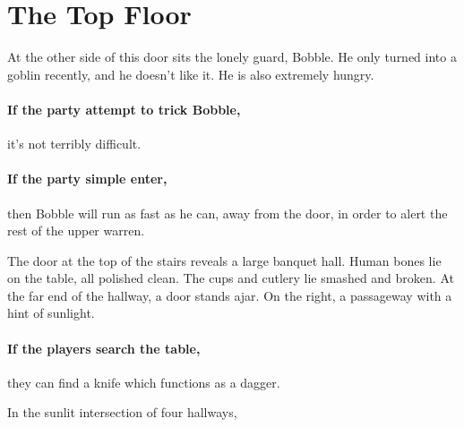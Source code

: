 \section{The Top Floor}
\label{upper}

\setcounter{list}{0}

\begin{multicols}{2}

\begin{figure*}[t]
	
\end{figure*}


At the other side of this door sits the lonely guard, Bobble.
He only turned into a goblin recently, and he doesn't like it.
He is also extremely hungry.

\paragraph{If the party attempt to trick Bobble,}
it's not terribly difficult.

\paragraph{If the party simple enter,}
then Bobble will run as fast as he can, away from the door, in order to alert the rest of the upper warren.



\begin{boxtext}

	The door at the top of the stairs reveals a large banquet hall.
	Human bones lie on the table, all polished clean.
	The cups and cutlery lie smashed and broken.
	At the far end of the hallway, a door stands ajar.
	On the right, a passageway with a hint of sunlight.

\end{boxtext}

\paragraph{If the players search the table,}
they can find a knife which functions as a dagger.


\begin{boxtext}

	In the sunlit intersection of four hallways,
	\iftoggle{hardcore}%
		{three ogres sit playing a game of dice.  Two are clad in black leather armour, with a massive sword by its side.}%
		{two ogres sit playing a game of dice, one of which is clad in black, leather armour, with a massive sword by its side.}%


\end{boxtext}
\end{multicols}
